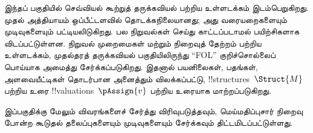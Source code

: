 \documentclass[../../include/open-logic-part]{subfiles}
\begin{document}

\begin{editorial}
  இந்தப் பகுதியில் செவ்வியல் கூற்றுத் தருக்கவியல் பற்றிய உள்ளடக்கம்
  இடம்பெறுகிறது. முதல் அத்தியாயம் ஒப்பீட்டளவில் தொடக்கநிலையானது; அது
  வரையறைகளையும் முடிவுகளையும் பட்டியலிடுகிறது. பல நிறுவல்கள் செய்து
  காட்டப்படாமல் பயிற்சிகளாக விடப்பட்டுள்ளன. நிறுவல் முறைமைகள் மற்றும்
  நிறைவுத் தேற்றம் பற்றிய உள்ளடக்கம், முதல்தரத் தருக்கவியல் பகுதியிலிருந்து
  ``FOL'' குறிச்சொல்லைப் பொய்யாக அமைத்து சேர்க்கப்படுகிறது. இதனால்
  பயனிலைகள், பதங்கள், அளவையீட்டிகள் தொடர்பான அனைத்தும் விலக்கப்பட்டு,
  !!{structure}s~$\Struct{M}$ பற்றிய உரை !!{valuation}s~$\pAssign{v}$
  பற்றிய உரையாக மாற்றப்படுகிறது.

  இப்பகுதிக்கு மேலும் விவரங்களைச் சேர்த்து விரிவுபடுத்தவும்,
  மெய்மதிப்புசார் நிறைவு போன்ற கூடுதல் தலைப்புகளையும் முடிவுகளையும்
  சேர்க்கவும் திட்டமிடப்பட்டுள்ளது.
\end{editorial}










\OLEndPartHook
\end{document}
